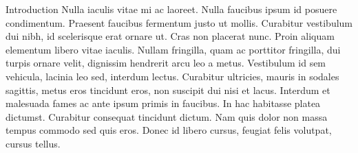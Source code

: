 Introduction Nulla iaculis vitae mi ac laoreet. Nulla faucibus ipsum id posuere condimentum. Praesent faucibus fermentum justo ut mollis. Curabitur vestibulum dui nibh, id scelerisque erat ornare ut. Cras non placerat nunc. Proin aliquam elementum libero vitae iaculis. Nullam fringilla, quam ac porttitor fringilla, dui turpis ornare velit, dignissim hendrerit arcu leo a metus. Vestibulum id sem vehicula, lacinia leo sed, interdum lectus. Curabitur ultricies, mauris in sodales sagittis, metus eros tincidunt eros, non suscipit dui nisi et lacus. Interdum et malesuada fames ac ante ipsum primis in faucibus. In hac habitasse platea dictumst. Curabitur consequat tincidunt dictum. Nam quis dolor non massa tempus commodo sed quis eros. Donec id libero cursus, feugiat felis volutpat, cursus tellus.